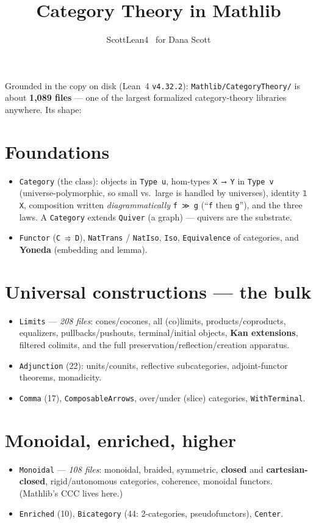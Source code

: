 \documentclass[11pt]{article}
\title{Category Theory in Mathlib}
\author{ScottLean4 \textperiodcentered\ for Dana Scott}
\date{}
\newcommand{\code}[1]{\texttt{#1}}
\begin{document}
\maketitle

Grounded in the copy on disk (Lean~4 \code{v4.32.2}): \code{Mathlib/CategoryTheory/}
is about \textbf{1{,}089 files} --- one of the largest formalized
category-theory libraries anywhere. Its shape:

\section*{Foundations}
\begin{itemize}
  \item \code{Category} (the class): objects in \code{Type u}, hom-types
    \code{X ⟶ Y} in \code{Type v} (universe-polymorphic, so small vs.\ large is
    handled by universes), identity \code{𝟙 X}, composition written
    \emph{diagrammatically} \code{f ≫ g} (``\code{f} then \code{g}''), and the
    three laws. A \code{Category} extends \code{Quiver} (a graph) --- quivers are
    the substrate.
  \item \code{Functor} (\code{C ⥤ D}), \code{NatTrans} / \code{NatIso},
    \code{Iso}, \code{Equivalence} of categories, and \textbf{Yoneda} (embedding
    and lemma).
\end{itemize}

\section*{Universal constructions --- the bulk}
\begin{itemize}
  \item \code{Limits} --- \emph{208 files}: cones/cocones, all (co)limits,
    products/coproducts, equalizers, pullbacks/pushouts, terminal/initial
    objects, \textbf{Kan extensions}, filtered colimits, and the full
    preservation/reflection/creation apparatus.
  \item \code{Adjunction} (22): units/counits, reflective subcategories,
    adjoint-functor theorems, monadicity.
  \item \code{Comma} (17), \code{ComposableArrows}, over/under (slice)
    categories, \code{WithTerminal}.
\end{itemize}

\section*{Monoidal, enriched, higher}
\begin{itemize}
  \item \code{Monoidal} --- \emph{108 files}: monoidal, braided, symmetric,
    \textbf{closed} and \textbf{cartesian-closed}, rigid/autonomous categories,
    coherence, monoidal functors. (Mathlib's CCC lives here.)
  \item \code{Enriched} (10), \code{Bicategory} (44: 2-categories,
    pseudofunctors), \code{Center}.
\end{itemize}
\end{document}
